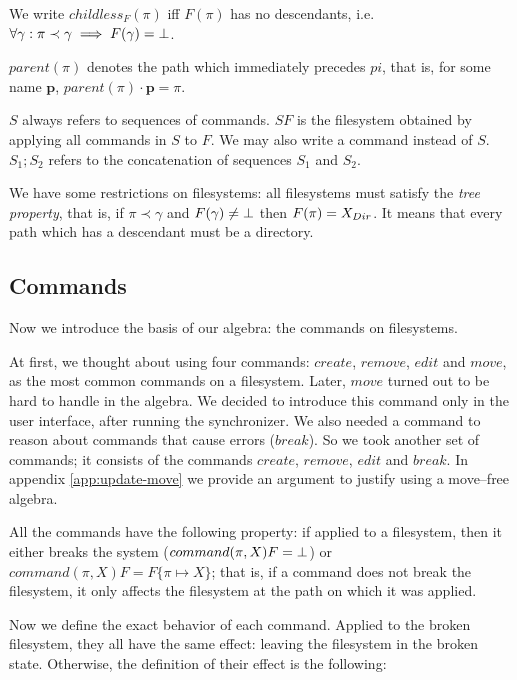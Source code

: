 We write \(childless_F(\pi)\) iff \(F(\pi)\) has no descendants,
i.e. \(\forall\gamma: \pi\prec\gamma\implies F(\gamma)=\bot\).

\(parent(\pi)\) denotes the path which immediately precedes \(pi\), that
is, for some name \(\mathbf{p}\), \(parent(\pi)\cdot \mathbf{p}=\pi\).

\(S\) always refers to sequences of commands. \(SF\) is the filesystem
obtained by applying all commands in \(S\) to \(F\). We may also write a
command instead of \(S\). \(S_1;S_2\) refers to the concatenation of
sequences \(S_1\) and \(S_2\).

We have some restrictions on filesystems: all filesystems must satisfy
the \emph{tree property}, that
is, if \(\pi\prec\gamma\) and \(F(\gamma)\neq\bot\) then
\(F(\pi)=X_{Dir}\). It means that every path which has a descendant must
be a directory.

\subsection{Commands}

Now we introduce the basis of our algebra: the commands on filesystems.

At first, we
thought about using four commands: \(create\), \(remove\), \(edit\) and
\(move\), as the most common commands on a filesystem. Later, \(move\)
turned out to be hard to handle in the algebra. We decided to introduce
this command only in the user interface, after running the synchronizer.
We also needed a command to reason about commands that cause errors
(\(break\)). So we took another set of commands; it consists of the
commands \(create\), \(remove\), \(edit\) and \(break\). In appendix
\ref{app:update-move} we provide an argument to justify using a
move--free
algebra.

\begin{notrsi}
All the commands have the following property: if applied to a filesystem,
then it either breaks the system (\(command(\pi,X)F=\bot\)) or 
\(command(\pi,X)F=F\{\pi\mapsto X\}\); that is, if a command does not
break the filesystem, it only affects the filesystem at the path on which
it was applied. 
\end{notrsi}

Now we define the exact behavior of each command.
Applied to the broken filesystem, they all have the same effect:  leaving
the filesystem in the broken state. Otherwise, 
the definition of their effect is the following: 

